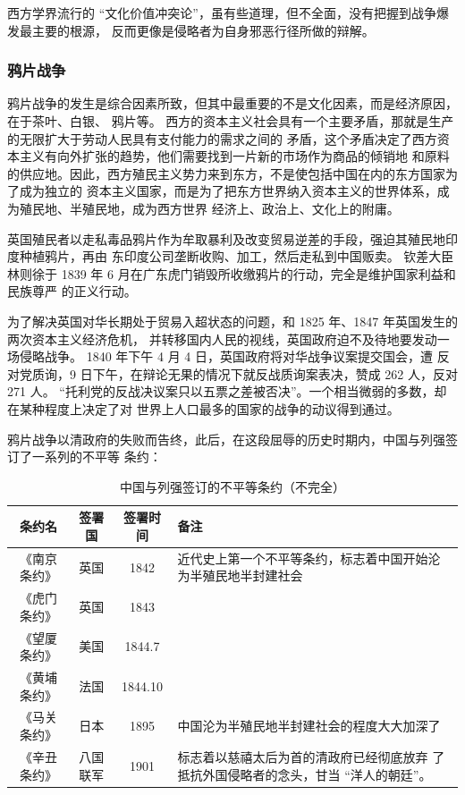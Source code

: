 \documentclass[10pt, UTF8]{book} %
\begin{document}
西方学界流行的 “文化价值冲突论”，虽有些道理，但不全面，没有把握到战争爆发最主要的根源，
反而更像是侵略者为自身邪恶行径所做的辩解。

\subsubsection{鸦片战争}

鸦片战争的发生是综合因素所致，但其中最重要的不是文化因素，而是经济原因，在于茶叶、白银、
鸦片等。
西方的资本主义社会具有一个主要矛盾，那就是生产的无限扩大于劳动人民具有支付能力的需求之间的
矛盾，这个矛盾决定了西方资本主义有向外扩张的趋势，他们需要找到一片新的市场作为商品的倾销地
和原料的供应地。因此，西方殖民主义势力来到东方，不是使包括中国在内的东方国家为了成为独立的
资本主义国家，而是为了把东方世界纳入资本主义的世界体系，成为殖民地、半殖民地，成为西方世界
经济上、政治上、文化上的附庸。

英国殖民者以走私毒品鸦片作为牟取暴利及改变贸易逆差的手段，强迫其殖民地印度种植鸦片，再由
东印度公司垄断收购、加工，然后走私到中国贩卖。
钦差大臣林则徐于 1839 年 6 月在广东虎门销毁所收缴鸦片的行动，完全是维护国家利益和民族尊严
的正义行动。

为了解决英国对华长期处于贸易入超状态的问题，和 1825 年、1847 年英国发生的两次资本主义经济危机，
并转移国内人民的视线，英国政府迫不及待地要发动一场侵略战争。
1840 年下午 4 月 4 日，英国政府将对华战争议案提交国会，遭
反对党质询，9 日下午，在辩论无果的情况下就反战质询案表决，赞成 262 人，反对 271 人。
“托利党的反战决议案只以五票之差被否决”。一个相当微弱的多数，却在某种程度上决定了对
世界上人口最多的国家的战争的动议得到通过。

鸦片战争以清政府的失败而告终，此后，在这段屈辱的历史时期内，中国与列强签订了一系列的不平等
条约：
\begin{table}[H]
    \centering
    \caption{中国与列强签订的不平等条约（不完全）}
    \label{table: 中国与列强签订的不平等条约（不完全）}
    \begin{tabular}{c c c p{6cm}}
        \hline
        条约名 & 签署国 & 签署时间 & 备注 \\ 
        \hline 
        《南京条约》 & 英国 & 1842 & 近代史上第一个不平等条约，标志着中国开始沦为半殖民地半封建社会 \\
        《虎门条约》 & 英国 & 1843 & \\ 
        《望厦条约》 & 美国 & 1844.7 & \\ 
        《黄埔条约》 & 法国 & 1844.10 & \\ 
        《马关条约》 & 日本 & 1895 & 中国沦为半殖民地半封建社会的程度大大加深了 \\ 
        《辛丑条约》 & 八国联军 & 1901& 标志着以慈禧太后为首的清政府已经彻底放弃
        了抵抗外国侵略者的念头，甘当 “洋人的朝廷”。 \\
        \hline
    \end{tabular}
\end{table}
\end{document}
